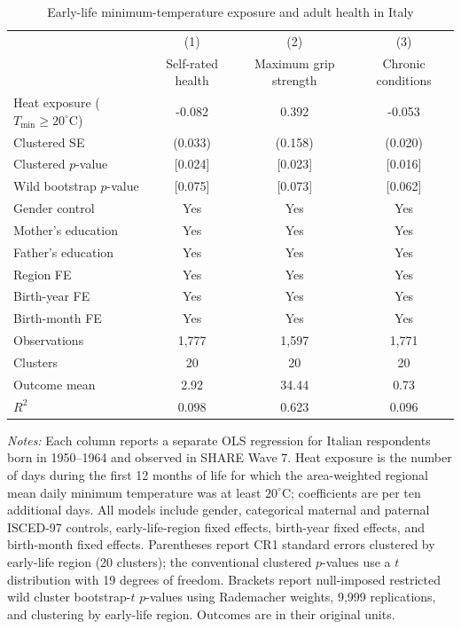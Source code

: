 \begin{table}[!htbp]
\centering
\caption{Early-life minimum-temperature exposure and adult health in Italy}
\label{tab:italy-tmin20-wild-cluster}
\begin{tabular}{lccc}
\toprule
 & (1) & (2) & (3) \\
 & Self-rated health & Maximum grip strength & Chronic conditions \\
\midrule
Heat exposure ($T_{\min} \geq 20^{\circ}$C) & -0.082 & 0.392 & -0.053 \\
Clustered SE & (0.033) & (0.158) & (0.020) \\
Clustered $p$-value & [0.024] & [0.023] & [0.016] \\
Wild bootstrap $p$-value & [0.075] & [0.073] & [0.062] \\
\midrule
Gender control & Yes & Yes & Yes \\
Mother's education & Yes & Yes & Yes \\
Father's education & Yes & Yes & Yes \\
Region FE & Yes & Yes & Yes \\
Birth-year FE & Yes & Yes & Yes \\
Birth-month FE & Yes & Yes & Yes \\
\midrule
Observations & 1,777 & 1,597 & 1,771 \\
Clusters & 20 & 20 & 20 \\
Outcome mean & 2.92 & 34.44 & 0.73 \\
$R^2$ & 0.098 & 0.623 & 0.096 \\
\bottomrule
\end{tabular}
\begin{minipage}{0.94\textwidth}\footnotesize
\textit{Notes:} Each column reports a separate OLS regression for Italian respondents born in 1950--1964 and observed in SHARE Wave 7. Heat exposure is the number of days during the first 12 months of life for which the area-weighted regional mean daily minimum temperature was at least $20^{\circ}$C; coefficients are per ten additional days. All models include gender, categorical maternal and paternal ISCED-97 controls, early-life-region fixed effects, birth-year fixed effects, and birth-month fixed effects. Parentheses report CR1 standard errors clustered by early-life region (20 clusters); the conventional clustered $p$-values use a $t$ distribution with 19 degrees of freedom. Brackets report null-imposed restricted wild cluster bootstrap-$t$ $p$-values using Rademacher weights, 9,999 replications, and clustering by early-life region. Outcomes are in their original units.
\end{minipage}
\end{table}
